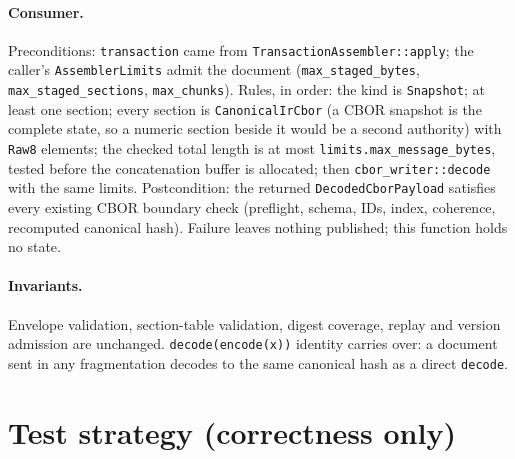 \documentclass[11pt,a4paper]{article}
\begin{document}
\paragraph{Consumer.} Preconditions: \texttt{transaction} came from \texttt{TransactionAssembler::apply}; the caller's
\texttt{AssemblerLimits} admit the document (\texttt{max\_staged\_bytes}, \texttt{max\_staged\_sections},
\texttt{max\_chunks}). Rules, in order: the kind is \texttt{Snapshot}; at least one section; every section is
\texttt{CanonicalIrCbor} (a CBOR snapshot is the complete state, so a numeric section beside it would be a second
authority) with \texttt{Raw8} elements; the checked total length is at most \texttt{limits.max\_message\_bytes},
tested before the concatenation buffer is allocated; then \texttt{cbor\_writer::decode} with the same limits.
Postcondition: the returned \texttt{DecodedCborPayload} satisfies every existing CBOR boundary check (preflight,
schema, IDs, index, coherence, recomputed canonical hash). Failure leaves nothing published; this function holds no
state.

\paragraph{Invariants.} Envelope validation, section-table validation, digest coverage, replay and version admission
are unchanged. \texttt{decode(encode(x))} identity carries over: a document sent in any fragmentation decodes to the
same canonical hash as a direct \texttt{decode}.

\section{Test strategy (correctness only)}
\end{document}
